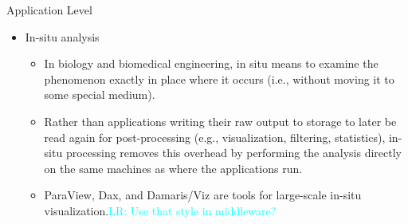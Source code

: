 \documentclass[compress,11pt,xcolor=svgnames,aspectratio=169]{beamer}
\newcommand{\lr}[1]{\textcolor{cyan}{LR: #1}}
\begin{document}
\begin{frame}[fragile] {Application Level}

\begin{itemize}

\item In-situ analysis\\[0.4cm]

    \begin{itemize}
    \setlength\itemsep{0.6cm}

    \item In biology and biomedical engineering, in situ means to examine the phenomenon exactly in place where it occurs (i.e., without moving it to some special medium).

    \item Rather than applications writing their raw output to storage to later be read again for post-processing (e.g., visualization, filtering, statistics), in-situ processing removes this overhead by performing the analysis directly on the same machines as where the applications run.

    \item ParaView, Dax, and Damaris/Viz are tools for large-scale in-situ visualization.\lr{Use that style in middleware?}

    \end{itemize}

\end{itemize}

\nocite{3372390}

\end{frame}
\end{document}
